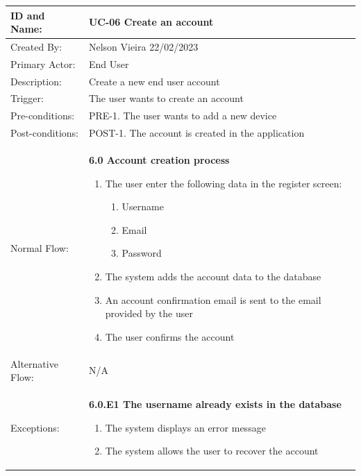 \begin{table}[H]
    \centering
    \begin{adjustbox}{width=1.2\textwidth,center=\textwidth}
        \begin{tabular}{|m{4cm}|m{12cm}|}
            \hline
            ID and Name: & UC-06 Create an account \\
            \hline
            Created By: & Nelson Vieira 22/02/2023 \\
            \hline
            Primary Actor: & End User \\
            \hline
            Description: & Create a new end user account \\
            \hline
            Trigger: & The user wants to create an account \\
            \hline
            Pre-conditions: & PRE-1. The user wants to add a new device \\
            \hline
            Post-conditions: & POST-1. The account is created in the application \\
            \hline
            Normal Flow: & \textbf{6.0 Account creation process}
            \begin{enumerate}
                \item The user enter the following data in the register screen:
                \begin{enumerate}
                    \item Username
                    \item Email
                    \item Password
                \end{enumerate}
                \item The system adds the account data to the database
                \item An account confirmation email is sent to the email provided by the user
                \item The user confirms the account
            \end{enumerate} \\
            \hline
            Alternative Flow: & N/A \\
            \hline
            Exceptions: & \textbf{6.0.E1  The username already exists in the database}
            \begin{enumerate}
                \item The system displays an error message
                \item The system allows the user to recover the account

\end{enumerate}
\end{tabular}
\end{adjustbox}
\end{table}
